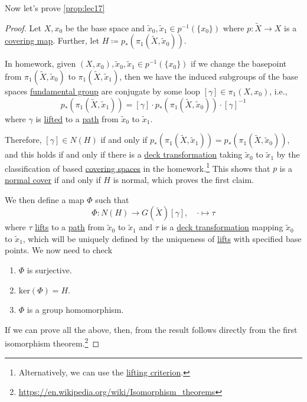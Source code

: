 Now let's prove \autoref{prop:lec17}
\begin{proof}
	Let \(X, x_0\) be the base space and \(\widetilde{x} _0, \widetilde{x} _1\in p^{-1} (\{x_0\})\) where \(p\colon \widetilde{X} \to X\) is a
	\hyperref[def:covering-map]{covering map}. Further, let \(H\coloneqq p_\ast(\pi _1(\widetilde{X} , \widetilde{x} _0))\).

	In homework, given \((X, x_0), \widetilde{x} _0, \widetilde{x} _1\in p^{-1} (\{x_0\})\) if we change the basepoint from \(\pi _1(\widetilde{X} , \widetilde{x} _0)\)
	to \(\pi _1(\widetilde{X} , \widetilde{x} _1)\), then we have the induced subgroups of the base spaces \hyperref[def:fundamental-group]{fundamental group}
	are conjugate by some loop \([\gamma ]\in \pi _1(X, x_0)\), i.e.,
	\[
		p_\ast (\pi _1(\widetilde{X} , \widetilde{x} _1)) = [\gamma ]\cdot p_\ast (\pi _1(\widetilde{X} , \widetilde{x} _0))\cdot [\gamma ]^{-1}
	\]
	where \(\gamma\) is \hyperref[prop:homotopy-lifting-property]{lifted} to a \hyperref[def:path]{path} from \(\widetilde{x} _0\) to \(\widetilde{x} _1\).

	\par Therefore, \([\gamma ]\in N(H)\) if and only if \(p_\ast(\pi _1(\widetilde{X} , \widetilde{x} _1)) = p_\ast(\pi _1(\widetilde{X} , \widetilde{x} _0))\),
	and this holds if and only if there is a \hyperref[def:deck-transformation]{deck transformation} taking \(\widetilde{x} _0\) to \(\widetilde{x} _1\)
	by the classification of based \hyperref[def:covering-space]{covering spaces} in the homework.\footnote{Alternatively, we can use the \hyperref[prop:lifting-criterion]{lifting criterion}.}
	This shows that \(p\) is a \hyperref[def:normal]{normal cover} if and only if \(H\) is normal, which proves the first claim.

	\par We then define a map \(\Phi \) such that
	\[
		\Phi \colon N(H)\to G(\widetilde{X} )[\gamma ],\quad \cdot \mapsto \tau
	\]
	where \(\tau \) \hyperref[prop:homotopy-lifting-property]{lifts} to a \hyperref[def:path]{path} from \(\widetilde{x} _0\) to \(\widetilde{x} _1\) and
	\(\tau \) is a \hyperref[def:deck-transformation]{deck transformation} mapping \(\widetilde{x} _0\) to \(\widetilde{x} _1\), which will be
	uniquely defined by the uniqueness of \hyperref[prop:homotopy-lifting-property]{lifts} with specified base points. We now need to check
	\begin{enumerate}
		\item \(\Phi \) is surjective.
		\item \(\mathrm{ker} (\Phi )= H\).
		\item \(\Phi \) is a group homomorphism.
	\end{enumerate}
	If we can prove all the above, then, from the result follows directly from the first isomorphism theorem.\footnote{\url{https://en.wikipedia.org/wiki/Isomorphism_theorems}}


\end{proof}
